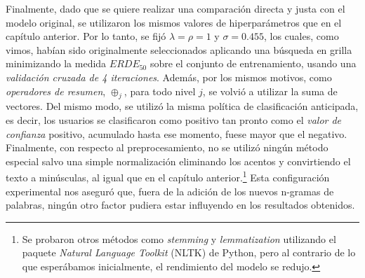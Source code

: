 Finalmente, dado que se quiere realizar una comparación directa y justa con el modelo original, se utilizaron los mismos valores de hiperparámetros que en el capítulo anterior.
Por lo tanto, se fijó $\lambda=\rho=1$ y $\sigma= 0.455$, los cuales, como vimos, habían sido originalmente seleccionados aplicando una búsqueda en grilla minimizando la medida $ERDE_{50}$ sobre el conjunto de entrenamiento, usando una \emph{validación cruzada de 4 iteraciones}.
Además, por los mismos motivos, como \emph{operadores de resumen}, $\oplus_j$, para todo nivel $j$, se volvió a utilizar la suma de vectores.
Del mismo modo, se utilizó la misma política de clasificación anticipada, es decir, los usuarios se clasificaron como positivo tan pronto como el \emph{valor de confianza} positivo, acumulado hasta ese momento, fuese mayor que el negativo.
Finalmente, con respecto al preprocesamiento, no se utilizó ningún método especial salvo una simple normalización eliminando los acentos y convirtiendo el texto a minúsculas, al igual que en el capítulo anterior.\footnote{
Se probaron otros métodos como \emph{stemming} y \emph{lemmatization} utilizando el paquete \emph{Natural Language Toolkit} (NLTK) de Python, pero al contrario de lo que esperábamos inicialmente, el rendimiento del modelo se redujo.}
Esta configuración experimental nos aseguró que, fuera de la adición de los nuevos n-gramas de palabras, ningún otro factor pudiera estar influyendo en los resultados obtenidos.



